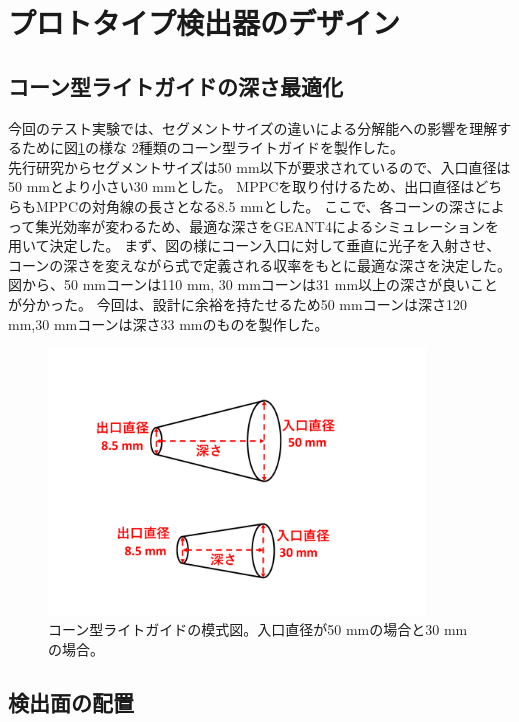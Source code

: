 \section{プロトタイプ検出器のデザイン}
\subsection{}
\subsection{コーン型ライトガイドの深さ最適化}
今回のテスト実験では、セグメントサイズの違いによる分解能への影響を理解するために図\ref{cone}の様な
2種類のコーン型ライトガイドを製作した。\\
先行研究からセグメントサイズは50 mm以下が要求されているので、入口直径は50 mmとより小さい30 mmとした。
MPPCを取り付けるため、出口直径はどちらもMPPCの対角線の長さとなる8.5 mmとした。
ここで、各コーンの深さによって集光効率が変わるため、最適な深さをGEANT4によるシミュレーションを用いて決定した。
まず、図の様にコーン入口に対して垂直に光子を入射させ、コーンの深さを変えながら式で定義される収率をもとに最適な深さを決定した。
図から、50 mmコーンは110 mm, 30 mmコーンは31 mm以上の深さが良いことが分かった。
今回は、設計に余裕を持たせるため50 mmコーンは深さ120 mm,30 mmコーンは深さ33 mmのものを製作した。
\begin{figure}[htbp]
  \centering
  \includegraphics[width=10cm]{images/chapter3/cone.pdf}
  \caption{コーン型ライトガイドの模式図。入口直径が50 mmの場合と30 mmの場合。}
  \label{cone}
\end{figure}

\subsection{検出面の配置}